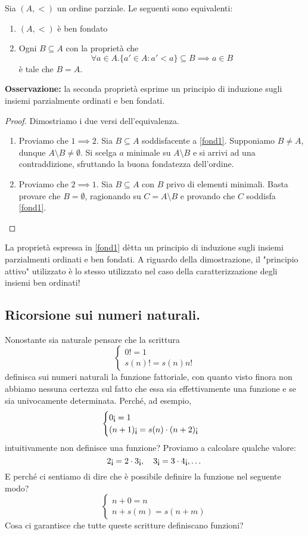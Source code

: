 \begin{thm}
  Sia \((A,<)\) un ordine parziale. Le seguenti sono equivalenti:
  \begin{enumerate}
    \item \((A,<)\) è ben fondato
    \item Ogni \(B \subseteq A\) con la proprietà che
    \[
    \forall a \in A. \lbrace a' \in A \colon a' < a \rbrace \subseteq B \implies a \in B \label{fond1}
    \]
    è tale che \(B = A\).
  \end{enumerate}
\end{thm}
{\bf Osservazione:} la seconda proprietà esprime un principio di induzione sugli insiemi parzialmente ordinati e ben fondati.
\begin{proof} Dimostriamo i due versi dell'equivalenza.
  \begin{enumerate}
    \item Proviamo che \(1 \implies 2\). Sia \(B \subseteq A\) soddisfacente a \eqref{fond1}. Supponiamo \(B \neq A\), dunque \(A \setminus B \neq \emptyset\). Si scelga \(a\) minimale su \(A \setminus B\) e si arrivi ad una contraddizione, sfruttando la buona fondatezza dell'ordine.
    \item Proviamo che \(2 \implies 1\). Sia \(B \subseteq A\) con \(B\) privo di elementi minimali. Basta provare che \(B = \emptyset\), ragionando su \(C = A \setminus B\) e provando che \(C\) soddisfa \eqref{fond1}. \qedhere
  \end{enumerate}
\end{proof}
La proprietà espressa in \eqref{fond1} dètta un principio di induzione sugli insiemi parzialmenti ordinati e ben fondati. A riguardo della dimostrazione, il "principio attivo" utilizzato è lo stesso utilizzato nel caso della caratterizzazione degli insiemi ben ordinati!


\subsection{Ricorsione sui numeri naturali.}

Nonostante sia naturale pensare che la scrittura
\[
  \begin{cases}
    0! = 1 \\ s(n)! = s(n)n!
  \end{cases}
\]
definisca sui numeri naturali la funzione fattoriale, con quanto visto finora non abbiamo nessuna certezza sul fatto che essa sia effettivamente una funzione e se sia univocamente determinata. Perché, ad esempio,
\[
  \begin{cases}
    0\escrov = 1 \\ (n+1)\escrov = s(n)\cdot(n+2)\escrov
  \end{cases}
\]
intuitivamente non definisce una funzione? Proviamo a calcolare qualche valore:
\[
2\escrov = 2\cdot3\escrov,\quad 3\escrov = 3\cdot4\escrov,\dots
\]
E perché ci sentiamo di dire che è possibile definire la funzione nel seguente modo?
\[
  \begin{cases}
    n + 0 = n \\ n + s(m) = s(n + m)
  \end{cases}
\]
Cosa ci garantisce che tutte queste scritture definiscano funzioni?

